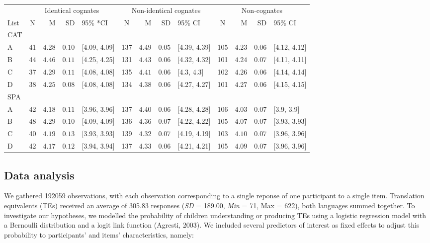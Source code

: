 \documentclass[
  english,
  man,man,floatsintext]{apa6}
\begin{document}
\captionsetup[table]{labelformat=empty,skip=1pt}
\begin{longtable}{lcrrlcrrlcrrl}
\toprule
& \multicolumn{4}{c}{Identical cognates} & \multicolumn{4}{c}{Non-identical cognates} & \multicolumn{4}{c}{Non-cognates} \\ 
 \cmidrule(lr){2-5}\cmidrule(lr){6-9}\cmidrule(lr){10-13}
List & N & M & SD & 95\% *CI & N & M & SD & 95\% CI & N & M & SD & 95\% CI \\ 
\midrule
\multicolumn{1}{l}{CAT} \\ 
\midrule
A & 41 & $4.28$ & $0.10$ & [4.09, 4.09] & 137 & $4.49$ & $0.05$ & [4.39, 4.39] & 105 & $4.23$ & $0.06$ & [4.12, 4.12] \\ 
B & 44 & $4.46$ & $0.11$ & [4.25, 4.25] & 131 & $4.43$ & $0.06$ & [4.32, 4.32] & 101 & $4.24$ & $0.07$ & [4.11, 4.11] \\ 
C & 37 & $4.29$ & $0.11$ & [4.08, 4.08] & 135 & $4.41$ & $0.06$ & [4.3, 4.3] & 102 & $4.26$ & $0.06$ & [4.14, 4.14] \\ 
D & 38 & $4.25$ & $0.08$ & [4.08, 4.08] & 134 & $4.38$ & $0.06$ & [4.27, 4.27] & 101 & $4.27$ & $0.06$ & [4.15, 4.15] \\ 
\midrule
\multicolumn{1}{l}{SPA} \\ 
\midrule
A & 42 & $4.18$ & $0.11$ & [3.96, 3.96] & 137 & $4.40$ & $0.06$ & [4.28, 4.28] & 106 & $4.03$ & $0.07$ & [3.9, 3.9] \\ 
B & 48 & $4.29$ & $0.10$ & [4.09, 4.09] & 136 & $4.36$ & $0.07$ & [4.22, 4.22] & 105 & $4.07$ & $0.07$ & [3.93, 3.93] \\ 
C & 40 & $4.19$ & $0.13$ & [3.93, 3.93] & 139 & $4.32$ & $0.07$ & [4.19, 4.19] & 103 & $4.10$ & $0.07$ & [3.96, 3.96] \\ 
D & 42 & $4.17$ & $0.12$ & [3.94, 3.94] & 137 & $4.33$ & $0.06$ & [4.21, 4.21] & 105 & $4.09$ & $0.07$ & [3.96, 3.96] \\ 
\bottomrule
\end{longtable}

\hypertarget{data-analysis}{%
\subsection{Data analysis}\label{data-analysis}}

We gathered 192059 observations, with each observation corresponding to a single reponse of one participant to a single item. Translation equivalents (TEs) received an average of 305.83 responses (\emph{SD} = 189.00, \emph{Min} = 71, Max = 622), both languages summed together. To investigate our hypotheses, we modelled the probability of children understanding or producing TEs using a logistic regression model with a Bernoulli distribution and a logit link function (Agresti, 2003). We included several predictors of interest as fixed effects to adjust this probability to participants' and items' characteristics, namely:
\end{document}
